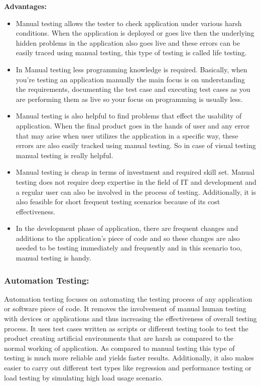 \textbf{Advantages:}
\begin{itemize}
\item Manual testing allows the tester to check application under various harsh conditions.
When the application is deployed or goes live then the underlying hidden problems
in the application also goes live and these errors can be easily traced using manual
testing, this type of testing is called life testing.
\item In Manual testing less programming knowledge is required. Basically, when you're
testing an application manually the main focus is on understanding the requirements,
documenting the test case and executing test cases as you are performing
them as live so your focus on programming is usually less.
\item Manual testing is also helpful to find problems that effect the usability of application.
When the final product goes in the hands of user and any error that may arise when user utilizes the application in a specific way, these errors are also easily tracked
using manual testing. So in case of visual testing manual testing is really helpful.
\item Manual testing is cheap in terms of investment and required skill set. Manual testing
does not require deep expertise in the field of IT and development and a regular
user can also be involved in the process of testing. Additionally, it is also feasible
for short frequent testing scenarios because of its cost effectiveness.
\item In the development phase of application, there are frequent changes and additions
to the application's piece of code and so these changes are also needed to be testing
immediately and frequently and in this scenario too, manual testing is handy.
\end{itemize}


\subsubsection{Automation Testing:}
Automation testing focuses on automating the testing process of any application or software piece of code. It removes the involvement of manual human testing with devices or applications and thus increasing the effectiveness of overall testing process. It uses test cases written as scripts or different testing tools to test the product creating artificial environments that are harsh as compared to the normal working of application. As compared to manual testing this type of testing is much more reliable and yields faster results. Additionally, it also makes easier to carry out different test types like regression and performance testing or load testing by simulating high load usage scenario.

